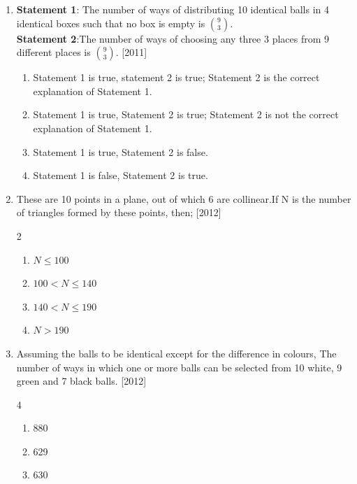 \documentclass[journal,12pt,twocolumn]{IEEEtran}
\theoremstyle{remark}
\begin{document}
\begin{enumerate}
	\begin{multicols}{4}
	\begin{enumerate}
     \item 36
     \item 66
     \item 108
     \item 3
        \end{enumerate}
	\end{multicols}
\item \textbf{Statement 1}: The number of ways of distributing 10 identical balls in 4 identical boxes such that no box is empty is $9\choose3$.\\\textbf{Statement 2}:The number of ways of choosing any three 3 places from 9 different places is $9\choose3$. \hfill[2011]
 \begin{enumerate}
     \item Statement 1 is true, statement 2 is true; Statement 2 is the correct explanation of Statement 1.
     \item Statement 1 is true, Statement 2 is true; Statement 2 is not the correct explanation of Statement 1.
     \item Statement 1 is true, Statement 2 is false.
     \item Statement 1 is false, Statement 2 is true.
 \end{enumerate}
\item These are 10 points in a plane, out of which 6 are collinear.If N is the number of triangles formed by these points, then; \hfill[2012]
	\begin{multicols}{2}
	\begin{enumerate}
     \item $N\le100$
     \item $100<N\le140$
     \item $140<N\le190$
     \item $N>190$
        \end{enumerate}
	\end{multicols}
\item Assuming the balls to be identical except for the difference in colours, The number of ways in which one or more balls can be selected from 10 white, 9 green and 7 black balls. \hfill[2012]
	\begin{multicols}{4}
	\begin{enumerate}
     \item 880
     \item 629
     \item 630

\end{enumerate}
\end{multicols}
\end{enumerate}
\end{document}

